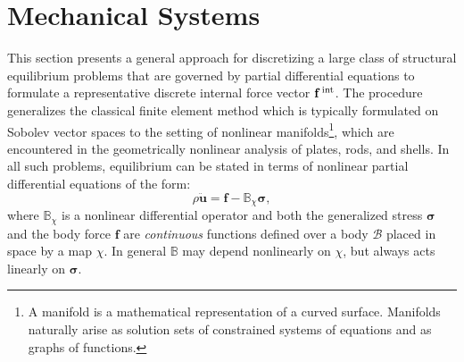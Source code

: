 

\iftrue
\section{Mechanical Systems}

This section presents a general approach for discretizing a large class of structural equilibrium problems that are governed by partial differential equations to formulate a representative discrete internal force vector $\mathbf{f}^{\,\text{int}}$. 
The procedure generalizes the classical finite element method which is typically formulated on Sobolev vector spaces \citep{hughes1987finite} to the setting of nonlinear manifolds{\footnote{A manifold is a mathematical representation of a curved surface. Manifolds naturally arise as solution sets of constrained systems of equations and as graphs of functions.}}, which are encountered in the geometrically nonlinear analysis of plates, rods, and shells.
In all such problems, equilibrium can be stated in terms of nonlinear partial differential equations of the form:
\begin{equation}
\rho \ddot{\bm{u}} = \bm{f} -  \mathbb{B}_\chi\bm{\sigma},
\label{eq:strong}
\end{equation}
where \(\mathbb{B}_\chi\) is a nonlinear
differential operator and both the generalized stress \(\bm{\sigma}\) and the body force \(\bm{f}\) are \emph{continuous} functions defined over a body \(\mathcal{B}\) placed in space by a
map \(\chi\). In general \(\mathbb{B}\) may depend nonlinearly on \(\chi\),
but always acts linearly on \(\bm{\sigma}\). 
\iftrue

